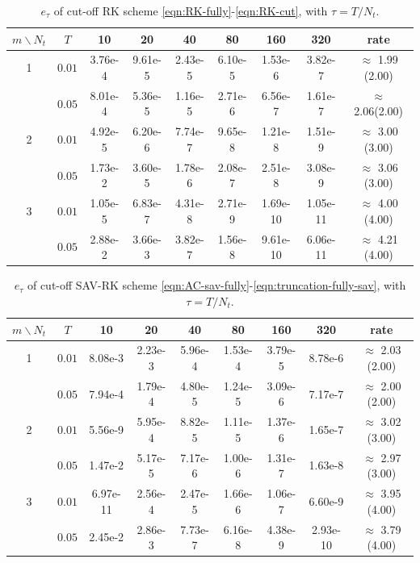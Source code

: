 \documentclass[10pt,final,leqno,onefignum,onetabnum]{siamltex}%
\begin{document}
\begin{table}[h]
\centering
\caption{$e_\tau$ of cut-off RK scheme \eqref{eqn:RK-fully}-\eqref{eqn:RK-cut}, with $\tau=T/N_t$.}
\label{table:ex1_time}
\begin{tabular}{|c|c|cccccc|c|}
\hline
$m\backslash N_t$  & $T$   &10 &20 &40 &80 &160 & 320 & rate \\
\hline
1   &   $ 0.01$& 3.76e-4& 9.61e-5& 2.43e-5& 6.10e-5& 1.53e-6& 3.82e-7 &$\approx$ 1.99 (2.00)    \\
    &   $ 0.05$ & 8.01e-4& 5.36e-5& 1.16e-5& 2.71e-6& 6.56e-7& 1.61e-7 &$\approx$ 2.06(2.00)   \\
\hline
2   &   $ 0.01$& 4.92e-5& 6.20e-6& 7.74e-7& 9.65e-8& 1.21e-8& 1.51e-9 &$\approx$ 3.00 (3.00)    \\
    &   $ 0.05$ & 1.73e-2& 3.60e-5& 1.78e-6& 2.08e-7& 2.51e-8& 3.08e-9 &$\approx$ 3.06 (3.00)    \\
\hline
3   &   $0.01$& 1.05e-5& 6.83e-7& 4.31e-8& 2.71e-9& 1.69e-10& 1.05e-11 &$\approx$ 4.00 (4.00)    \\
    &   $0.05$ & 2.88e-2& 3.66e-3& 3.82e-7& 1.56e-8& 9.61e-10& 6.06e-11 &$\approx$ 4.21 (4.00)    \\
\hline
\end{tabular}
\end{table}




 \begin{table}[!h]
\centering
\caption{$e_\tau$ of cut-off SAV-RK scheme \eqref{eqn:AC-sav-fully}-\eqref{eqn:truncation-fully-sav}, with $\tau=T/N_t$.}
\label{table:ex1_time-sav}
\begin{tabular}{|c|c|cccccc|c|}
\hline
$m\backslash N_t$  & $T$   &10 &20 &40 &80 &160 & 320 & rate \\
\hline
1   &   $0.01$& 8.08e-3& 2.23e-3& 5.96e-4& 1.53e-4& 3.79e-5& 8.78e-6 &$\approx$ 2.03 (2.00)    \\
    &   $0.05$& 7.94e-4& 1.79e-4& 4.80e-5& 1.24e-5& 3.09e-6& 7.17e-7 &$\approx$ 2.00 (2.00)   \\
\hline
2   &   $0.01$& 5.56e-9& 5.95e-4& 8.82e-5& 1.11e-5& 1.37e-6& 1.65e-7 &$\approx$ 3.02 (3.00)    \\
    &   $0.05$& 1.47e-2& 5.17e-5& 7.17e-6& 1.00e-6& 1.31e-7& 1.63e-8 &$\approx$ 2.97 (3.00)    \\
\hline
3   &   $0.01$& 6.97e-11& 2.56e-4& 2.47e-5& 1.66e-6& 1.06e-7& 6.60e-9 &$\approx$ 3.95 (4.00)    \\
    &   $0.05$& 2.45e-2& 2.86e-3& 7.73e-7& 6.16e-8& 4.38e-9& 2.93e-10 &$\approx$ 3.79 (4.00)    \\
\hline
\end{tabular}
\end{table}
\end{document}
